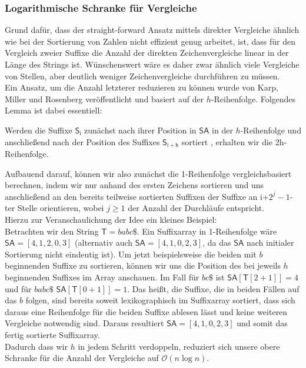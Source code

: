 \subsubsection{Logarithmische Schranke für Vergleiche}
Grund dafür, dass der straight-forward Ansatz mittels direkter Vergleiche ähnlich wie bei der Sortierung von Zahlen nicht effizient genug arbeitet, ist, dass für den Vergleich zweier Suffixe die Anzahl der direkten Zeichenvergleiche linear in der Länge des Strings ist. Wünschenswert wäre es daher zwar ähnlich viele Vergleiche von Stellen, aber deutlich weniger Zeichenvergleiche durchführen zu müssen.\\
Ein Ansatz, um die Anzahl letzterer reduzieren zu können wurde von Karp, Miller und Rosenberg \cite{Karp} veröffentlicht und basiert auf der $h$-Reihenfolge. Folgendes Lemma ist dabei essentiell:
\begin{lemma}
\label{manmyers}
Werden die Suffixe $\mathsf{S_i}$ zunächst nach ihrer Position in $\mathsf{SA}$ in der $h$-Reihenfolge und anschließend nach der Position des Suffixes $\mathsf{S_{i+h}}$ sortiert , erhalten wir die 2h-Reihenfolge.
\end{lemma}
Aufbauend darauf, können wir also zunächst die 1-Reihenfolge vergleichsbasiert berechnen, indem wir nur anhand des ersten Zeichens sortieren und uns anschließend an den bereits teilweise sortierten Suffixen der Suffixe an i+$2^j-1$-ter Stelle orientieren, wobei $j \geq 1$ der Anzahl der Durchläufe entspricht.\\
Hierzu zur Veranschaulichung der Idee ein kleines Beispiel:\\
Betrachten wir den String $\mathsf{T} =  babc\$ $. Ein Suffixarray in 1-Reihenfolge wäre $\mathsf{SA}=[4,1,2,0,3]$ (alternativ auch $\mathsf{SA}=[4,1,0,2,3]$, da das $\mathsf{SA}$ nach initialer Sortierung nicht eindeutig ist). Um jetzt beispielsweise die beiden mit $ b $ beginnenden Suffixe zu sortieren, können wir uns die Position des bei jeweils $h$ beginnenden Suffixes im Array anschauen. Im Fall für $ bc\$ $  ist $\mathsf{SA}[\mathsf{T}[2+1]]=4$ und für $ babc\$ $ $\mathsf{SA}[\mathsf{T}[0+1]]=1$. Das heißt, die Suffixe, die in beiden Fällen auf das $ b $ folgen, sind bereits soweit lexikographisch im Suffixarray sortiert, dass sich daraus eine Reihenfolge für die beiden Suffixe ablesen lässt und keine weiteren Vergleiche notwendig sind. Daraus resultiert $\mathsf{SA}=[4,1,0,2,3]$ und somit das fertig sortierte Suffixarray.\\
Dadurch dass wir $h$ in jedem Schritt verdoppeln, reduziert sich unsere obere Schranke für die Anzahl der Vergleiche auf $\mathcal{O}(n\log n)$.
